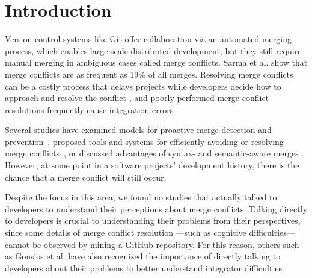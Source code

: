 \section{Introduction}\label{introduction}



Version control systems like Git offer collaboration via an automated merging process, which enables large-scale distributed development, but they still require manual merging in ambiguous cases called merge conflicts. Sarma et al. \cite{cassandra} show that merge conflicts are as frequent as 19\% of all merges. Resolving merge conflicts can be a costly process that delays projects while developers decide how to approach and resolve the conflict \cite{cassandra}, and poorly-performed merge conflict resolutions frequently cause integration errors \cite{bird-branches-conflict}.


Several studies have examined models for proactive merge detection and prevention~\cite{Brun2011}\cite{palantir}\cite{Guimaraes}, proposed tools and systems for efficiently avoiding or resolving merge conflicts~\cite{nishimura}\cite{mens2002state}, or discussed advantages of syntax- and semantic-aware merges \cite{danny_refactorings}\cite{hunt2002extensible}. However, at some point in a software projects' development history, there is the chance that a merge conflict will still occur. 


Despite the focus in this area, we found no studies that actually talked to developers to understand their perceptions about merge conflicts. Talking directly to developers is crucial to understanding their problems from their perspectives, since some details of merge conflict resolution ---such as cognitive difficulties--- cannot be observed by mining a GitHub repository. For this reason, others such as Gousios et al. \cite{integrator_perspective} have also recognized the importance of directly talking to developers about their problems to better understand integrator difficulties.\\

